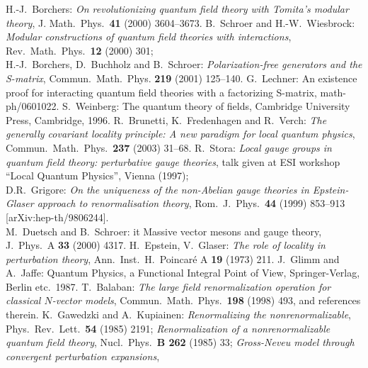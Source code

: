 \documentclass[multphys,vecphys]{svmult}
\begin{document}
\begin{thebibliography}{99}
 H.-J.~Borchers: {\it On revolutionizing quantum field theory
  with Tomita's modular theory}, J. Math.\ Phys.\ {\bf 41} (2000) 3604--3673.
%
 B.~Schroer and H.-W.~Wiesbrock: {\em Modular constructions
    of quantum field theories with interactions}, Rev.\ Math.\ Phys.\
  {\bf 12} (2000) 301; \\
H.-J.~Borchers, D.~Buchholz and B.~Schroer: 
{\em Polarization-free generators and the S-matrix}, 
Commun.\ Math.\ Phys. {\bf 219} (2001) 125--140.
%
 G.~Lechner:
An existence proof for interacting quantum field theories with a
factorizing S-matrix, math-ph/0601022.
%
 S.~Weinberg: 
The quantum theory of fields, 
Cambridge University Press, Cambridge, 1996.
%
  R.~Brunetti, K.~Fredenhagen and R.~Verch: {\it The generally
  covariant locality principle: A new paradigm for local 
  quantum physics},
  Commun.\ Math.\ Phys.\  {\bf 237} (2003) 31--68.
%
R.~Stora: {\it Local gauge groups in quantum field
  theory: perturbative gauge theories}, talk given at ESI workshop
``Local Quantum Physics'', Vienna (1997); \\
D.R.~Grigore: {\it On the uniqueness of the non-Abelian gauge
  theories in Epstein-Glaser approach to renormalisation theory},
  Rom.\ J.\ Phys.\  {\bf 44} (1999) 853--913
  [arXiv:hep-th/9806244]. \\
M.~Duetsch and B.~Schroer:
  {it Massive vector mesons and gauge theory}, 
  J.\ Phys.\ A {\bf 33} (2000) 4317.
 H.~Epstein, V.~Glaser:
{\it The role of locality in perturbation theory},
Ann.\ Inst.\ H.\ Poincar\'e A {\bf 19} (1973) 211.
%
 J.~Glimm and A.~Jaffe:  
Quantum Physics, a Functional Integral Point of View, 
Springer-Verlag, Berlin etc.\ 1987.
%
 T.~Balaban: 
{\it The large field renormalization operation for classical
  $N$-vector models},
Commun.\ Math.\ Phys.\ {\bf 198} (1998) 493, and references therein.
%
 K.~Gawedzki and A.~Kupiainen:
{\it Renormalizing the nonrenormalizable}, 
Phys.\ Rev.\ Lett.\ {\bf 54} (1985) 2191; 
{\it Renormalization of a nonrenormalizable quantum field theory}, 
Nucl.\ Phys.\ {\bf B 262} (1985) 33;
{\it Gross-Neveu model through convergent perturbation expansions},

\end{thebibliography}
\end{document}
